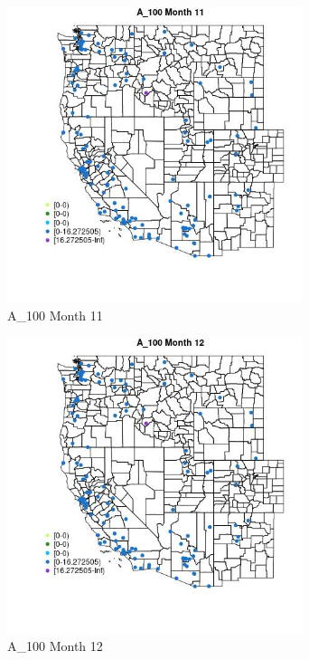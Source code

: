 \begin{figure} 
\centering  
\includegraphics[width=0.77\textwidth]{Code_Outputs/Report_ML_input_PM25_Step4_part_e_de_duplicated_aves_MapObsMo11A_100.jpg} 
\caption{\label{fig:Report_ML_input_PM25_Step4_part_e_de_duplicated_avesMapObsMo11A_100}A_100 Month 11} 
\end{figure} 
 

\begin{figure} 
\centering  
\includegraphics[width=0.77\textwidth]{Code_Outputs/Report_ML_input_PM25_Step4_part_e_de_duplicated_aves_MapObsMo12A_100.jpg} 
\caption{\label{fig:Report_ML_input_PM25_Step4_part_e_de_duplicated_avesMapObsMo12A_100}A_100 Month 12} 
\end{figure} 
 

